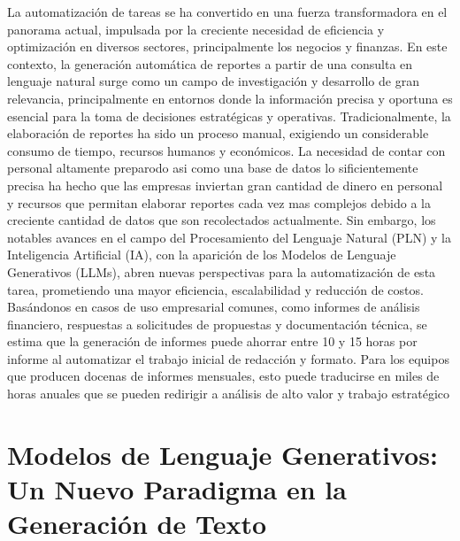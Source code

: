 La automatización de tareas se ha convertido en una fuerza transformadora en el panorama actual, impulsada por la creciente necesidad de eficiencia y optimización en diversos sectores, principalmente los negocios y finanzas. En este contexto, la generación automática de reportes a partir de una consulta en lenguaje natural surge como un campo de investigación y desarrollo de gran relevancia, principalmente en entornos donde la información precisa y oportuna es esencial para la toma de decisiones estratégicas y operativas. Tradicionalmente, la elaboración de reportes ha sido un proceso manual, exigiendo un considerable consumo de tiempo, recursos humanos y económicos. La necesidad de contar con personal altamente preparodo asi como una base de datos lo sificientemente precisa ha hecho que las empresas inviertan gran cantidad de dinero en personal y recursos que permitan elaborar reportes cada vez mas complejos debido a la creciente cantidad de datos que son recolectados actualmente. Sin embargo, los notables avances en el campo del Procesamiento del Lenguaje Natural (PLN) y la Inteligencia Artificial (IA), con la aparición de los Modelos de Lenguaje Generativos (LLMs), abren nuevas perspectivas para la automatización de esta tarea, prometiendo una mayor eficiencia, escalabilidad y reducción de costos.
Basándonos en casos de uso empresarial comunes, como informes de análisis financiero, respuestas a solicitudes de propuestas y documentación técnica, se estima que la generación de informes puede ahorrar entre 10 y 15 horas por informe al automatizar el trabajo inicial de redacción y formato. Para los equipos que producen docenas de informes mensuales, esto puede traducirse en miles de horas anuales que se pueden redirigir a análisis de alto valor y trabajo estratégico

\section*{Modelos de Lenguaje Generativos: Un Nuevo Paradigma en la Generación de Texto}


